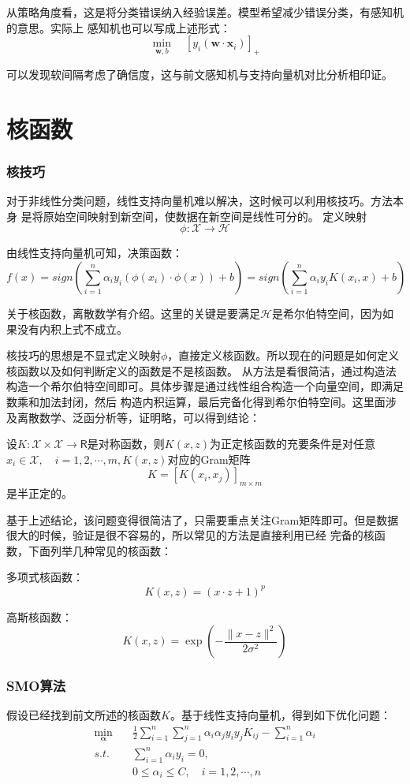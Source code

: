 \documentclass{article}
\begin{document}
        从策略角度看，这是将分类错误纳入经验误差。模型希望减少错误分类，有感知机的意思。实际上
        感知机也可以写成上述形式：
        \[\min_{\boldsymbol{w},b} \quad [y_i(\boldsymbol{w}\cdot\boldsymbol{x}_i)]_+\]

        可以发现软间隔考虑了确信度，这与前文感知机与支持向量机对比分析相印证。
        
\part{核函数}
    \setcounter{section}{0}
    \section{核技巧}
        对于非线性分类问题，线性支持向量机难以解决，这时候可以利用核技巧。方法本身
        是将原始空间映射到新空间，使数据在新空间是线性可分的。
        定义映射
        \[\phi :\mathcal{X}  \rightarrow \mathcal{H} \]
        
        由线性支持向量机可知，决策函数：
        \[f(x)=sign(\sum_{i=1}^{n}\alpha_iy_i(\phi(x_i)\cdot\phi(x))+b)=sign(\sum_{i=1}^{n}\alpha_iy_iK(x_i,x)+b)\]

        关于核函数，离散数学有介绍。这里的关键是要满足$\mathcal{H}$是希尔伯特空间，因为如果没有内积上式不成立。

        核技巧的思想是不显式定义映射$\phi$，直接定义核函数。所以现在的问题是如何定义核函数以及如何判断定义的函数是不是核函数。
        从方法是看很简洁，通过构造法构造一个希尔伯特空间即可。具体步骤是通过线性组合构造一个向量空间，即满足数乘和加法封闭，然后
        构造内积运算，最后完备化得到希尔伯特空间。这里面涉及离散数学、泛函分析等，证明略，可以得到结论：

        设$K:\mathcal{X} \times  \mathcal{X} \rightarrow \mathsf{R} $是对称函数，则$K(x,z)$为正定核函数的充要条件是对任意
        $x_i \in \mathcal{X},\quad i=1,2,\cdots,m,K(x,z)$对应的Gram矩阵
        \[K=[K(x_i,x_j)]_{m \times m}\]
        是半正定的。

        基于上述结论，该问题变得很简洁了，只需要重点关注Gram矩阵即可。但是数据很大的时候，验证是很不容易的，所以常见的方法是直接利用已经
        完备的核函数，下面列举几种常见的核函数：

        多项式核函数：
        \[K(x,z)=(x\cdot z+1)^p\]

        高斯核函数：
        \[K(x,z)=\exp(-\frac{\|x-z\|^2}{2\sigma ^2})\]

    \section{SMO算法}
        假设已经找到前文所述的核函数$K$。基于线性支持向量机，得到如下优化问题：
        \begin{align*}
            \min_{\boldsymbol{\alpha}} \quad & \frac{1}{2}\sum_{i=1}^{n}\sum_{j=1}^{n}\alpha_i\alpha_jy_iy_jK_{ij}-\sum_{i=1}^{n}\alpha_i \\
            s.t. \quad & \sum_{i=1}^{n}\alpha_iy_i=0, \\
            & 0 \le \alpha_i \le C,\quad i=1,2,\cdots,n
        \end{align*}
        
\end{document}
